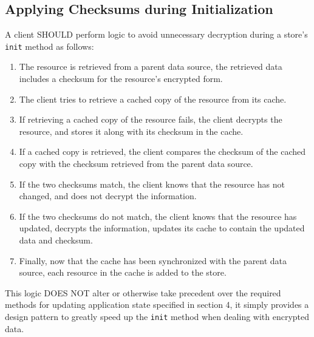 \documentclass{article}
\begin{document}
\subsection{Applying Checksums during Initialization}
A client SHOULD perform logic to avoid unnecessary decryption during a store's \verb|init| method as follows:
\begin{enumerate}
    \item The resource is retrieved from a parent data source, the retrieved data includes a checksum for the resource's encrypted form.
    \item The client tries to retrieve a cached copy of the resource from its cache.
    \item If retrieving a cached copy of the resource fails, the client decrypts the resource, and stores it along with its checksum in the cache.
    \item If a cached copy is retrieved, the client compares the checksum of the cached copy with the checksum retrieved from the parent data source.
    \item If the two checksums match, the client knows that the resource has not changed, and does not decrypt the information.
    \item If the two checksums do not match, the client knows that the resource has updated, decrypts the information, updates its cache to contain the updated data and checksum.
    \item Finally, now that the cache has been synchronized with the parent data source, each resource in the cache is added to the store.
\end{enumerate}
This logic DOES NOT alter or otherwise take precedent over the required methods for updating application state specified in section 4, it simply provides a design pattern to greatly speed up the \verb|init| method when dealing with encrypted data.
\end{document}
